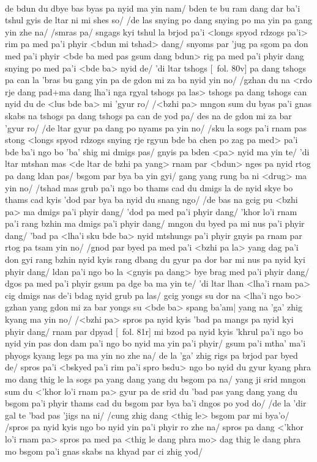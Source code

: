 \documentclass[12pt]{article}
\begin{document}
\textbf{\TVB}\\
de bdun du dbye bas byas pa nyid ma yin nam/ bden te bu ram dang dar ba'i tshul gyis de ltar ni mi shes so/ /de las snying po dang snying po ma yin pa gang yin zhe na/ /smras pa/ sngags kyi tshul la brjod pa'i <longs spyod rdzogs pa'i> rim pa med pa'i phyir <bdun mi tshad> dang/ snyoms par 'jug pa sgom pa don med pa'i phyir <bde ba med pas gsum dang bdun> rig pa med pa'i phyir dang snying po med pa'i <bde ba> nyid de/ 'di ltar tshogs [\TVB\ fol. 80v] pa dang tshogs pa can la 'bras bu gang yin pa de gdon mi za ba nyid yin no/ /gzhan du na <rdo rje dang pad+ma dang lha'i nga rgyal tshogs pa las> tshogs pa dang tshogs can nyid du de <lus bde ba> mi 'gyur ro/ /<bzhi pa> mngon sum du byas pa'i gnas skabs na tshogs pa dang tshogs pa can de yod pa/ des na de gdon mi za bar 'gyur ro/ /de ltar gyur pa dang po nyams pa yin no/ /sku la sogs pa'i rnam pas stong <longs spyod rdzogs snying rje rgyun bde ba chen po zag pa med> pa'i bde ba'i ngo bo 'ba' shig mi dmigs pas/ gnyis pa bden <pa> nyid ma yin te/ 'di ltar mtshan mas <de ltar de bzhi pa yang> rnam par <bdun> nges pa nyid rtog pa dang ldan pas/ bsgom par bya ba yin gyi/ gang yang rung ba ni <drug> ma yin no/ /tshad mas grub pa'i ngo bo thams cad du dmigs la de nyid skye bo thams cad kyis 'dod par bya ba nyid du snang ngo/ /de bas na gcig pu <bzhi pa> ma dmigs pa'i phyir dang/ 'dod pa med pa'i phyir dang/ 'khor lo'i rnam pa'i rang bzhin ma dmigs pa'i phyir dang/ mngon du byed pa mi nus pa'i phyir dang/ 'bad pa <lha'i sku bde ba> nyid mtshungs pa'i phyir gnyis pa rnam par rtog pa tsam yin no/ /gnod par byed pa med pa'i <bzhi pa la> yang dag pa'i don gyi rang bzhin nyid kyis rang dbang du gyur pa dor bar mi nus pa nyid kyi phyir dang/ ldan pa'i ngo bo la <gnyis pa dang> bye brag med pa'i phyir dang/ dgos pa med pa'i phyir gsum pa dge ba ma yin te/ 'di ltar lhan <lha'i rnam pa> cig dmigs nas de'i bdag nyid grub pa las/ gcig yongs su dor na <lha'i ngo bo> gzhan yang gdon mi za bar yongs su <bde ba> spang ba'am| yang na 'ga' zhig kyang ma yin no/ /<bzhi pa> spros pa nyid kyis 'bad pa mangs pa nyid kyi phyir dang/ rnam par dpyad [\TVB\ fol. 81r] mi bzod pa nyid kyis 'khrul pa'i ngo bo nyid yin pas don dam pa'i ngo bo nyid ma yin pa'i phyir/ gsum pa'i mtha' ma'i phyogs kyang legs pa ma yin no zhe na/ de la 'ga' zhig rigs pa brjod par byed de/ spros pa'i <bskyed pa'i rim pa'i spro bsdu> ngo bo nyid du gyur kyang phra mo dang thig le la sogs pa yang dang yang du bsgom pa na/ yang ji srid mngon sum du <'khor lo'i rnam pa> gyur pa de srid du 'bad pas yang dang yang du bsgom pa'i phyir thams cad du bsgom par bya ba'i dngos po yod do/ /de la 'dir gal te 'bad pas 'jigs na ni/ /cung zhig dang <thig le> bsgom par mi bya'o/ /spros pa nyid kyis ngo bo nyid yin pa'i phyir ro zhe na/ spros pa dang <'khor lo'i rnam pa> spros pa med pa <thig le dang phra mo> dag thig le dang phra mo bsgom pa'i gnas skabs na khyad par ci zhig yod/\\
\end{document}
